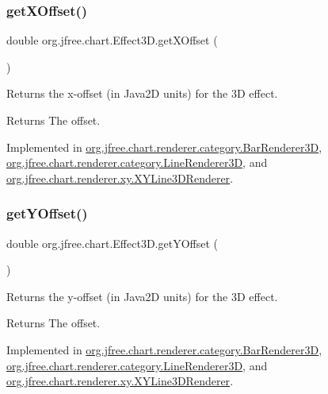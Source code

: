 \subsubsection{\texorpdfstring{get\+X\+Offset()}{getXOffset()}}
{\footnotesize\ttfamily double org.\+jfree.\+chart.\+Effect3\+D.\+get\+X\+Offset (\begin{DoxyParamCaption}{ }\end{DoxyParamCaption})}

Returns the x-\/offset (in Java2D units) for the 3D effect.

\begin{DoxyReturn}{Returns}
The offset. 
\end{DoxyReturn}


Implemented in \mbox{\hyperlink{classorg_1_1jfree_1_1chart_1_1renderer_1_1category_1_1_bar_renderer3_d_acfc9f055dd8b9ac17882a4395996646e}{org.\+jfree.\+chart.\+renderer.\+category.\+Bar\+Renderer3D}}, \mbox{\hyperlink{classorg_1_1jfree_1_1chart_1_1renderer_1_1category_1_1_line_renderer3_d_ad4ec91cbd2dd6ec17a01be964f076ad1}{org.\+jfree.\+chart.\+renderer.\+category.\+Line\+Renderer3D}}, and \mbox{\hyperlink{classorg_1_1jfree_1_1chart_1_1renderer_1_1xy_1_1_x_y_line3_d_renderer_a54f46c28c7bdc128e08b4281efc8d3e5}{org.\+jfree.\+chart.\+renderer.\+xy.\+X\+Y\+Line3\+D\+Renderer}}.

\mbox{\label{interfaceorg_1_1jfree_1_1chart_1_1_effect3_d_abcbf35b295e17395237fa4ed03dd9d8e}} 
\subsubsection{\texorpdfstring{get\+Y\+Offset()}{getYOffset()}}
{\footnotesize\ttfamily double org.\+jfree.\+chart.\+Effect3\+D.\+get\+Y\+Offset (\begin{DoxyParamCaption}{ }\end{DoxyParamCaption})}

Returns the y-\/offset (in Java2D units) for the 3D effect.

\begin{DoxyReturn}{Returns}
The offset. 
\end{DoxyReturn}


Implemented in \mbox{\hyperlink{classorg_1_1jfree_1_1chart_1_1renderer_1_1category_1_1_bar_renderer3_d_ae0180e0a6256ed5d439f5f00a4f035a9}{org.\+jfree.\+chart.\+renderer.\+category.\+Bar\+Renderer3D}}, \mbox{\hyperlink{classorg_1_1jfree_1_1chart_1_1renderer_1_1category_1_1_line_renderer3_d_aeaf2b0eef57a0a0b9dbcf5b56af1c5fa}{org.\+jfree.\+chart.\+renderer.\+category.\+Line\+Renderer3D}}, and \mbox{\hyperlink{classorg_1_1jfree_1_1chart_1_1renderer_1_1xy_1_1_x_y_line3_d_renderer_a3515dadc0751fe1e43073c5f67cad3e1}{org.\+jfree.\+chart.\+renderer.\+xy.\+X\+Y\+Line3\+D\+Renderer}}.



